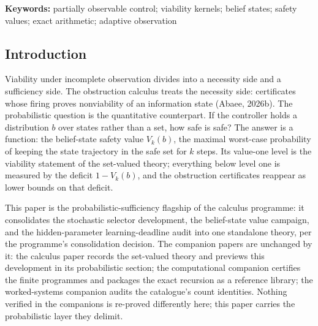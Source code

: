 \documentclass[10pt,twocolumn]{article}
\theoremstyle{plain}
\theoremstyle{definition}
\theoremstyle{remark}
\begin{document}
\begin{abstract}
within the blind window lifts the value to one --- 36 cell-horizon
combinations in all, enumerated in full. Fourth, adaptive observation: on
the declining hidden-parameter instance a single probe reveals the
parameter exactly (branch separation \(2\)), survival forces
\(z_{0} \ge 21/10\), and under revelation at horizon
\(T_{\mathrm{learn}}\) viability holds exactly when
\(z_{0} \ge 21/10 + T_{\mathrm{learn}}/10\) --- the learning deadline acts
as the timing obstruction's observation deadline, and the kernel shrinks
linearly and antitone in it (\(|K| = 5, 4, 3, 2, 1\)). All computations run
in exact rational arithmetic; the complete audited tables, the derivations
behind the closed form and the class declaration, and the five-figure set
are regenerated by the chained verification scripts.
\end{abstract}

\textbf{Keywords:} partially observable control; viability kernels;
belief states; safety values; exact arithmetic; adaptive observation

\subsection{Introduction}\label{introduction}

Viability under incomplete observation divides into a necessity side and a
sufficiency side. The obstruction calculus treats the necessity side:
certificates whose firing proves nonviability of an information state
(Abaee, 2026b). The probabilistic question is the quantitative counterpart.
If the controller holds a distribution \(b\) over states rather than a set,
how safe is safe? The answer is a function: the belief-state safety value
\(V_{k}(b)\), the maximal worst-case probability of keeping the state
trajectory in the safe set for \(k\) steps. Its value-one level is the
viability statement of the set-valued theory; everything below level one
is measured by the deficit \(1 - V_{k}(b)\), and the obstruction
certificates reappear as lower bounds on that deficit.

This paper is the probabilistic-sufficiency flagship of the calculus
programme: it consolidates the stochastic selector development, the
belief-state value campaign, and the hidden-parameter learning-deadline
audit into one standalone theory, per the programme's consolidation
decision. The companion papers are unchanged by it: the calculus paper
records the set-valued theory and previews this development in its
probabilistic section; the computational companion certifies the finite
programmes and packages the exact recursion as a reference library; the
worked-systems companion audits the catalogue's count identities. Nothing
verified in the companions is re-proved differently here; this paper
carries the probabilistic layer they delimit.
\end{document}
